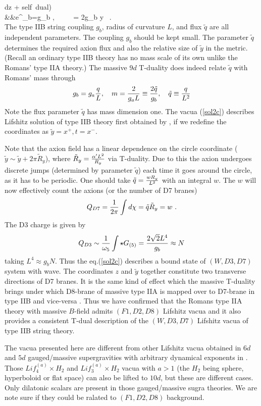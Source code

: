 \documentclass[12pt]{article}
\def\be{\begin{equation}} \def\ee{\end{equation}}
\newcommand{\eqn}[1]{(\ref{#1})}
\def\br{\nonumber\\}
\begin{document}
\wedge dz + {\rm self~dual}) \br
&&e^{\phi_b}=g_b , ~~~~ \chi= {2\over g_b} \tilde y \ .
\br 
\eea 
The type IIB string coupling $g_b$, radius of curvature $L$, 
and flux $\tilde{q}$ are all independent parameters.
The  coupling $g_b$  should be kept small.
The parameter $\tilde{q}$  determines the required
axion flux  and also the relative size of $\tilde {y}$ in the metric. 
(Recall  an ordinary type IIB  theory has 
no mass scale  of its own unlike the Romans' type IIA theory.)
The massive $9d$ T-duality  does indeed
relate $\tilde{q}$ with Romans' mass through
\be 
g_b=g_a {q\over L}, ~~~m={2\over g_a L}\equiv{2\tilde{q}\over g_b},~~~
\tilde{q}\equiv {q\over L^2}
 \ee
Note the  flux parameter $\tilde{q}$ has  mass dimension one.
The vacua \eqn{sol2c} describes   Lifshitz solution
 of  type IIB  theory first obtained by 
\cite{Balasubramanian:2010uk},
if we redefine the coordinates as $\tilde{y}=x^+, t=x^-$. 


Note  that  the axion field has a  linear dependence 
on the circle coordinate ($\tilde y\sim \tilde y +2\pi \tilde{R}_y$), 
where $\tilde{R}_y={\alpha' L^2\over R_y}$
via T-duality. Due to this the axion 
undergoes discrete jumps (determined by parameter $\tilde{q}$) each time  
it goes around the circle, as it has to be periodic.
One should  take $\tilde{q}={w R_y\over L^2 }$ with 
an integral $w$. The 
$w$ will now effectively count the  axions  (or the number of D7 branes)
\be 
Q_{D7}={1\over 2\pi}\int d\chi ={\tilde q}{\tilde R_y}=w\ .
\ee
The  D3 charge is given by
\be
\label{d3q}
Q_{D3}\sim{1\over \omega_5}
\int  \star G_{(5)}
= {2\sqrt{2} L^4 \over g_b}  \approx  N 
\ee
taking  $L^4\approx g_b N$. Thus the eq.\eqn{sol2c} 
 describes a bound state of  $(W,D3,D7)$  system with wave.
The  coordinates $z$ and $\tilde y$ together constitute 
two transverse directions of D7 branes.   
It is  the same kind of effect  which the massive T-duality 
brings under which D8-brane of massive type IIA is 
mapped over to D7-brane in type IIB and vice-versa \cite{berg}.
Thus we have 
confirmed that the Romans type IIA theory with  massive  $B$-field
admits   $(F1,D2,D8)$ Lifshitz vacua and it also 
provides a consistent T-dual  description of the  
 $(W,D3,D7)$ Lifshitz vacua of type IIB string theory.

The vacua presented here are different from 
other Lifshitz vacua obtained in $6d$ and $5d$ 
gauged/massive supergravities with arbitrary dynamical exponents
in \cite{greg,greg1}. Those 
$Lif_4^{(a)}\times H_2$ and $Lif_3^{(a)}\times H_2$ vacua 
with $a>1$ (the $H_2$ being sphere, hyperboloid or  flat space) 
can also be lifted to $10d$, but these are different cases.
Only dilatonic scalars are present in those 
gauged/massive sugra theories. We are note sure if they could
 be ralated to $(F1,D2,D8)$ background.
\end{document}
